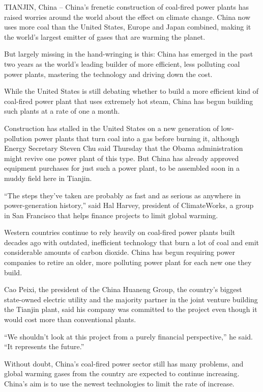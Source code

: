\documentclass[12pt,a4paper,onecolumn]{article}
\begin{document}
TIANJIN, China -- China's frenetic construction of coal-fired power plants has raised worries around
the world about the effect on climate change. China now uses more coal than the United States,
Europe and Japan combined, making it the world's largest emitter of gases that are warming the
planet.

But largely missing in the hand-wringing is this: China has emerged in the past two years as the
world's leading builder of more efficient, less polluting coal power plants, mastering the
technology and driving down the cost.

While the United States is still debating whether to build a more efficient kind of coal-fired power
plant that uses extremely hot steam, China has begun building such plants at a rate of one a month.

Construction has stalled in the United States on a new generation of low-pollution power plants that
turn coal into a gas before burning it, although Energy Secretary Steven Chu said Thursday that the
Obama administration might revive one power plant of this type. But China has already approved
equipment purchases for just such a power plant, to be assembled soon in a muddy field here in
Tianjin.

``The steps they've taken are probably as fast and as serious as anywhere in power-generation
history,'' said Hal Harvey, president of ClimateWorks, a group in San Francisco that helps finance
projects to limit global warming.

Western countries continue to rely heavily on coal-fired power plants built decades ago with
outdated, inefficient technology that burn a lot of coal and emit considerable amounts of carbon
dioxide. China has begun requiring power companies to retire an older, more polluting power plant
for each new one they build.

Cao Peixi, the president of the China Huaneng Group, the country's biggest state-owned electric
utility and the majority partner in the joint venture building the Tianjin plant, said his company
was committed to the project even though it would cost more than conventional plants.

``We shouldn't look at this project from a purely financial perspective,'' he said. ``It represents
the future.''

Without doubt, China's coal-fired power sector still has many problems, and global warming gases
from the country are expected to continue increasing. China's aim is to use the newest technologies
to limit the rate of increase.
\end{document}
